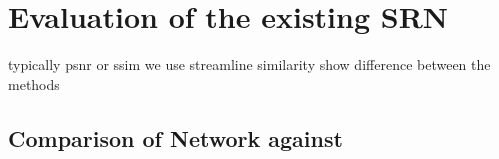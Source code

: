 
\chapter{Evaluation of the existing SRN}\label{chapter:network}
typically psnr or ssim
we use streamline similarity
show difference between the methods
\section{Comparison of Network against }